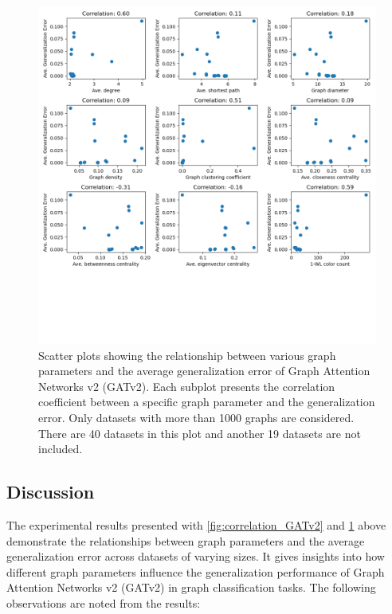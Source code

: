 \begin{figure}[H]
    \centering
    \includegraphics[width=\textwidth]{images/correlation_ignore_less_than_1000_GATv2.png}
    \caption{Scatter plots showing the relationship between various graph parameters and the average generalization error of Graph Attention Networks v2 (GATv2). Each subplot presents the correlation coefficient between a specific graph parameter and the generalization error. Only datasets with more than 1000 graphs are considered. There are 40 datasets in this plot and another 19 datasets are not included.}
    \label{fig:correlation_ignore_less_than_1000_GATv2}
\end{figure}

\subsection{Discussion}

The experimental results presented with \ref{fig:correlation_GATv2} and \ref{fig:correlation_ignore_less_than_1000_GATv2} above demonstrate the relationships between graph parameters and the average generalization error across datasets of varying sizes. It gives insights into how different graph parameters influence the generalization performance of Graph Attention Networks v2 (GATv2) in graph classification tasks. The following observations are noted from the results:

